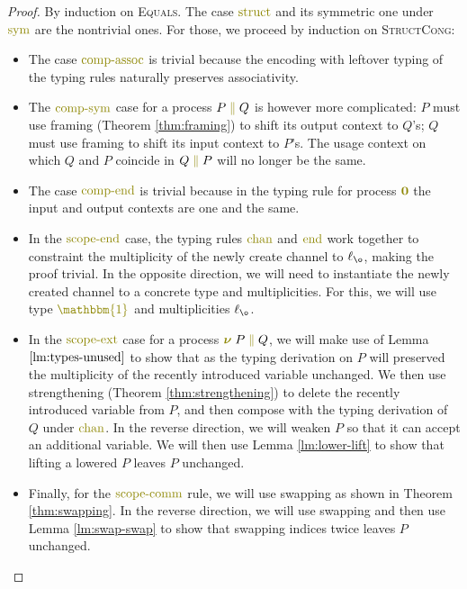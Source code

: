 \documentclass[a4paper,UKenglish,cleveref, autoref, thm-restate,authorcolumns]{lipics-v2019}
\theoremstyle{definition}
\newcommand{\constr}[1]{\textcolor{olive}{\operatorname{#1}}}
\newcommand{\PO}{\constr{\mathbf{0}}}
\newcommand{\comp}[2]{#1 \; \constr{\parallel} \; #2}
\newcommand{\new}{\constr{\boldsymbol{\nu}} \;}
\newcommand{\unit}{\constr{\mathbbm{1}}}
\begin{document}
\begin{proof}
  By induction on \textsc{Equals}.
  The case $\constr{struct}$ and its symmetric one under $\constr{sym}$ are the nontrivial ones.
  For those, we proceed by induction on \textsc{StructCong}:
  \begin{itemize}
    \item
      The case $\constr{comp-assoc}$ is trivial because the encoding with leftover typing of the typing rules naturally preserves associativity.
    \item
      The $\constr{comp-sym}$ case for a process $\comp{P}{Q}$ is however more complicated: $P$ must use framing (Theorem \ref{thm:framing}) to shift its output context to $Q$'s; $Q$ must use framing to shift its input context to $P$'s.
      The usage context on which $Q$ and $P$ coincide in $\comp{Q}{P}$ will no longer be the same.
    \item
      The case $\constr{comp-end}$ is trivial because in the typing rule for process $\PO$ the input and output contexts are one and the same.
    \item
      In the $\constr{scope-end}$ case, the typing rules $\constr{chan}$ and $\constr{end}$ work together to constraint the multiplicity of the newly create channel to $\ell_{\o}$, making the proof trivial.
      In the opposite direction, we will need to instantiate the newly created channel to a concrete type and multiplicities.
      For this, we will use type $\unit$ and multiplicities $\ell_{\o}$.
    \item
      In the $\constr{scope-ext}$ case for a process $\new \comp{P}{Q}$, we will make use of Lemma $\ref{lm:types-unused}$ to show that as the typing derivation on $P$ will preserved the multiplicity of the recently introduced variable unchanged.
      We then use strengthening (Theorem \ref{thm:strengthening}) to delete the recently introduced variable from $P$, and then compose with the typing derivation of $Q$ under $\constr{chan}$.
      In the reverse direction, we will weaken $P$ so that it can accept an additional variable.
      We will then use Lemma \ref{lm:lower-lift} to show that lifting a lowered $P$ leaves $P$ unchanged.
    \item
      Finally, for the $\constr{scope-comm}$ rule, we will use swapping as shown in Theorem \ref{thm:swapping}.
      In the reverse direction, we will use swapping and then use Lemma \ref{lm:swap-swap} to show that swapping indices twice leaves $P$ unchanged.
  \end{itemize}
\end{proof}
\end{document}

